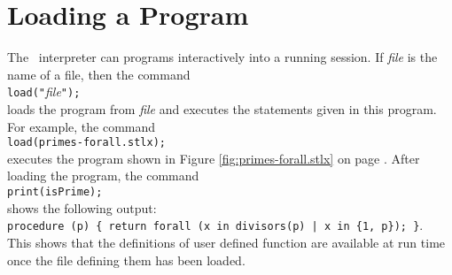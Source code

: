 \section{Loading a Program}
The \setlx\ interpreter can  programs interactively into a running session.
If \textsl{file} is the name of a file, then the command
\\[0.2cm]
\hspace*{1.3cm}
\texttt{load("}\textsl{file}\texttt{");}
\\[0.2cm]
loads the program from  \textsl{file} and executes the statements given in this program.
For example, the command
\\[0.2cm]
\hspace*{1.3cm}
\texttt{load(primes-forall.stlx);}
\\[0.2cm]
executes the program shown in Figure
\ref{fig:primes-forall.stlx} on page \pageref{fig:primes-forall.stlx}.
After loading the program, the command
\\[0.2cm]
\hspace*{1.3cm}
\texttt{print(isPrime);}
\\[0.2cm]
shows the following output:
\\[0.2cm]
\hspace*{1.3cm}
\texttt{procedure (p) \{ return forall (x in divisors(p) | x in \{1, p\}); \}}.
\\[0.2cm]
This shows that the definitions of user defined function are available at run time once the file defining them
has been loaded.

